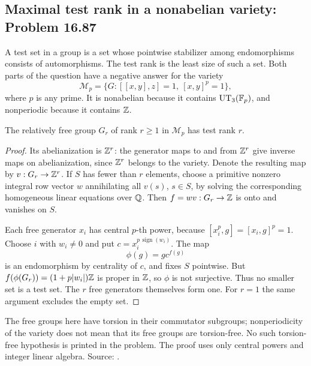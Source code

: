 \subsection{Maximal test rank in a nonabelian variety: Problem 16.87}
\label{cand:16.87}

A test set in a group is a set whose pointwise stabilizer among
endomorphisms consists of automorphisms. The test rank is the least
size of such a set. Both parts of the question have a negative answer
for the variety
\[
 \mathcal M_p=\{G:[[x,y],z]=1,\ [x,y]^p=1\},
\]
where \(p\) is any prime. It is nonabelian because it contains
\(\operatorname{UT}_3(\mathbb F_p)\), and nonperiodic because it contains
\(\mathbb Z\).

\begin{proposition}
The relatively free group \(G_r\) of rank \(r\geq1\) in
\(\mathcal M_p\) has test rank \(r\).
\end{proposition}
\begin{proof}
Its abelianization is \(\mathbb Z^r\): the generator maps to and from
\(\mathbb Z^r\) give inverse maps on abelianization, since \(\mathbb Z^r\)
belongs to the variety. Denote the resulting map by
\(v:G_r\to\mathbb Z^r\). If \(S\) has fewer than \(r\) elements,
choose a primitive nonzero integral row vector \(w\) annihilating
all \(v(s)\), \(s\in S\), by solving the corresponding homogeneous
linear equations over \(\mathbb Q\). Then \(f=wv:G_r\to\mathbb Z\) is onto
and vanishes on \(S\).

Each free generator \(x_i\) has central \(p\)-th power, because
\([x_i^p,g]=[x_i,g]^p=1\). Choose \(i\) with \(w_i\ne0\)
and put \(c=x_i^{p\,\operatorname{sign}(w_i)}\). The map
\[
 \phi(g)=g c^{f(g)}
\]
is an endomorphism by centrality of \(c\), and fixes \(S\)
pointwise. But
\(f(\phi(G_r))=(1+p|w_i|)\mathbb Z\) is proper in \(\mathbb Z\), so
\(\phi\) is not surjective. Thus no smaller set is a test set.
The \(r\) free generators themselves form one. For \(r=1\)
the same argument excludes the empty set.
\end{proof}

The free groups here have torsion in their commutator subgroups;
nonperiodicity of the variety does not mean that its free groups
are torsion-free. No such torsion-free hypothesis is printed in
the problem. The proof uses only central powers and integer
linear algebra. Source: .

